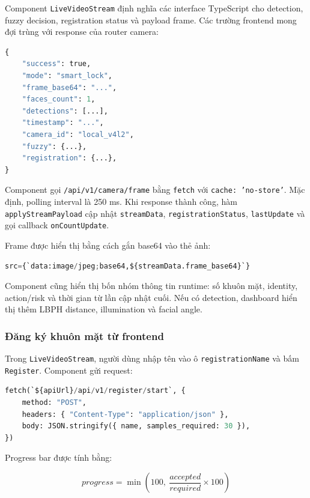 Component \texttt{LiveVideoStream} định nghĩa các interface TypeScript cho detection, fuzzy decision, registration status và payload frame. Các trường frontend mong đợi trùng với response của router camera:

\begin{lstlisting}[language=Python, caption={Payload frame ở mức dữ liệu frontend}]
{
    "success": true,
    "mode": "smart_lock",
    "frame_base64": "...",
    "faces_count": 1,
    "detections": [...],
    "timestamp": "...",
    "camera_id": "local_v4l2",
    "fuzzy": {...},
    "registration": {...},
}
\end{lstlisting}

Component gọi \texttt{/api/v1/camera/frame} bằng \texttt{fetch} với \texttt{cache: 'no-store'}. Mặc định, polling interval là 250 ms. Khi response thành công, hàm \texttt{applyStreamPayload} cập nhật \texttt{streamData}, \texttt{registrationStatus}, \texttt{lastUpdate} và gọi callback \texttt{onCountUpdate}.

Frame được hiển thị bằng cách gắn base64 vào thẻ ảnh:

\begin{lstlisting}[language=Python, caption={Biểu diễn frame JPEG base64 trên frontend}]
src={`data:image/jpeg;base64,${streamData.frame_base64}`}
\end{lstlisting}

Component cũng hiển thị bốn nhóm thông tin runtime: số khuôn mặt, identity, action/risk và thời gian từ lần cập nhật cuối. Nếu có detection, dashboard hiển thị thêm LBPH distance, illumination và facial angle.

\subsubsection{Đăng ký khuôn mặt từ frontend}

Trong \texttt{LiveVideoStream}, người dùng nhập tên vào ô \texttt{registrationName} và bấm \texttt{Register}. Component gửi request:

\begin{lstlisting}[language=Python, caption={Request bắt đầu đăng ký khuôn mặt}]
fetch(`${apiUrl}/api/v1/register/start`, {
    method: "POST",
    headers: { "Content-Type": "application/json" },
    body: JSON.stringify({ name, samples_required: 30 }),
})
\end{lstlisting}

Progress bar được tính bằng:

\begin{equation}
    progress = \min\left(100,\ \frac{accepted}{required} \times 100\right)
\end{equation}

